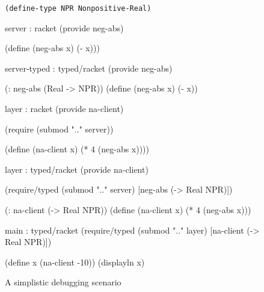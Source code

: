 \begin{figure}\footnotesize

\centerline{\tt (define-type NPR Nonpositive-Real)}

\vspace\spacr

\begin{module}{server : racket}{\dyncolor}
(provide neg-abs)

(define (neg-abs x) (- x)))
\end{module}\hfill\begin{module}{server-typed : typed/racket}{\typecolor}
(provide neg-abs)

(: neg-abs (Real -> NPR))
(define (neg-abs x) (- x))
\end{module}

\vspace\spacr

\begin{module}{layer : racket}{\dyncolor}
(provide na-client)

(require (submod ".." server))

(define (na-client x)
  (* 4 (neg-abs x))))
\end{module}\hfill\begin{module}{layer : typed/racket}{\typecolor}
(provide na-client)

(require/typed
 (submod ".." server)
 [neg-abs (-> Real NPR)])

(: na-client (-> Real NPR))
(define (na-client x)
  (* 4 (neg-abs x)))
\end{module}

\vspace\spacr

\begin{center}\begin{module}{main : typed/racket}{\typecolor}
(require/typed
  (submod ".." layer)
  [na-client (-> Real NPR)])

(define x (na-client -10))
(displayln x)
\end{module}\end{center}

\caption{A simplistic debugging scenario} \label{fig:rational}
\end{figure}
